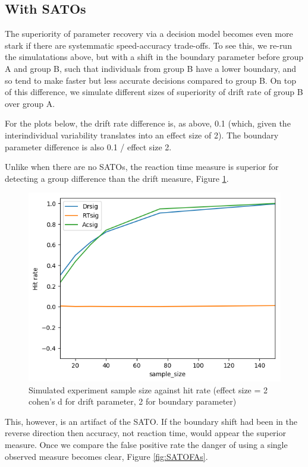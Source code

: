 \documentclass[floatsintext,doc]{apa6}
\theoremstyle{definition}
\theoremstyle{definition}
\theoremstyle{definition}
\theoremstyle{remark}
\begin{document}
\subsection{With SATOs}\label{with-satos}

The superiority of parameter recovery via a decision model becomes even
more stark if there are systemmatic speed-accuracy trade-offs. To see
this, we re-run the simulatations above, but with a shift in the
boundary parameter before group A and group B, such that individuals
from group B have a lower boundary, and so tend to make faster but less
accurate decisions compared to group B. On top of this difference, we
simulate different sizes of superiority of drift rate of group B over
group A.

For the plots below, the drift rate difference is, as above, 0.1 (which,
given the interindividual variability translates into an effect size of
2). The boundary parameter difference is also 0.1 / effect size 2.

Unlike when there are no SATOs, the reaction time measure is superior
for detecting a group difference than the drift measure, Figure
\ref{fig:SATOhits}.

\begin{figure}

{\centering \includegraphics[width=0.68\linewidth]{figs/SATO_HitRate} 

}

\caption{Simulated experiment sample size against hit rate (effect size = 2 cohen's d for drift parameter, 2 for boundary parameter)}\label{fig:SATOhits}
\end{figure}

This, however, is an artifact of the SATO. If the boundary shift had
been in the reverse direction then accuracy, not reaction time, would
appear the superior measure. Once we compare the false positive rate the
danger of using a single observed measure becomes clear, Figure
\ref{fig:SATOFAs}.
\end{document}
